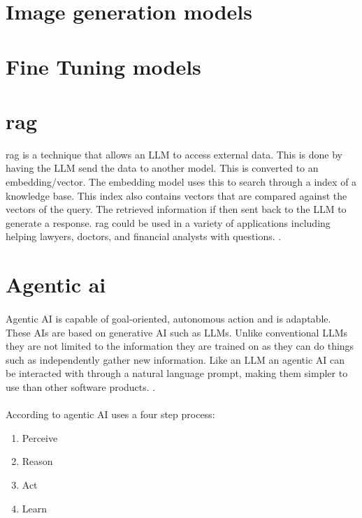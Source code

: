\section{Image generation models}
\paragraph{}






\section{Fine Tuning models}

\section{\acrfull{rag}}
\acrshort{rag} is a technique that allows an LLM to access external data. This is done by having the LLM send the data to another model. This is converted to an embedding/vector. The embedding model uses this to search through a index of a knowledge base. This index also contains vectors that are compared against the vectors of the query. The retrieved information if then sent back to the LLM to generate a response. \acrshort{rag} could be used in a variety of applications including helping lawyers, doctors, and financial analysts with questions. \autocite{merritt_what_2025}.

\section{Agentic \acrshort{ai}}
\paragraph{}Agentic AI is capable of goal-oriented, autonomous action and is adaptable. These AIs are based on generative AI such as LLMs. Unlike conventional LLMs they are not limited to the information they are trained on as they can do things such as independently gather new information. Like an LLM an agentic AI can be interacted with through a natural language prompt, making them simpler to use than other software products. \autocite{noauthor_what_2025}.

\paragraph{}According to \textcite{pounds_what_2024} agentic AI uses a four step process:
\begin{enumerate}
    \item Perceive
    \item Reason
    \item Act
    \item Learn
\end{enumerate}

